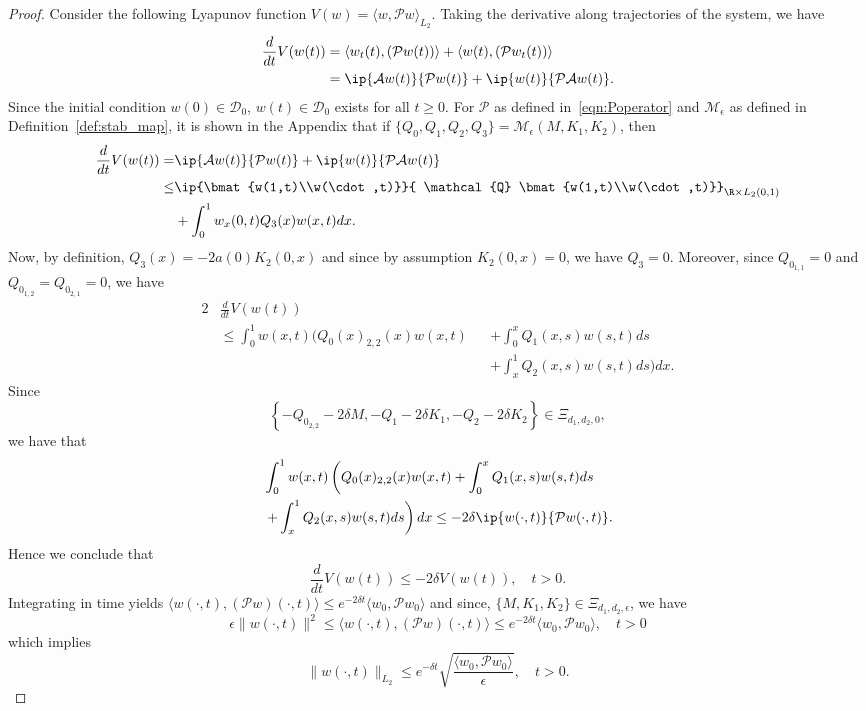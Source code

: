 \documentclass[9pt,journal,twocolumn]{IEEEtran}
\newcommand{\igzo}{\int_0^1}
\newcommand{\igzx}{\int_0^x}
\newcommand{\igxo}{\int_x^1}
\newcommand{\lt}{L_2(0,1)}
\begin{document}
\begin{proof}
 Consider the following Lyapunov function $ V(w)= \langle w,\mathcal{P}w \rangle_{L_2}$.
 Taking the derivative along trajectories of the system, we have
 \begin{align*}
 \frac{d}{dt}V(w(t))&= \langle w_t(t),(\mathcal{P}w(t)) \rangle+\langle w(t),(\mathcal{P}w_t(t)) \rangle\\
&=\ip{\mathcal{A}w(t)}{\mathcal{P}w(t)}+\ip{w(t)}{\mathcal{P}\mathcal{A}w(t)}.
\end{align*} Since the initial condition $w(0) \in \mathcal{D}_0$, $w(t) \in \mathcal{D}_0$ exists for all $t\ge 0$. For $\mathcal{P}$ as defined in~\eqref{eqn:Poperator} and $\mathcal{M}_\epsilon$ as defined in Definition~\ref{def:stab_map}, it is shown in the Appendix that if $\{Q_0,Q_1,Q_2,Q_3\}=\mathcal{M}_\epsilon(M,K_1,K_2)$, then
\begin{align*}
\frac{d}{dt}V(w(t))=&\ip{\mathcal{A}w(t)}{\mathcal{P}w(t)}+\ip{w(t)}{\mathcal{P}\mathcal{A}w(t)} \\
\leq&  \ip{\bmat{w(1,t)\\w(\cdot,t)}}{ \mathcal{Q} \bmat{w(1,t)\\w(\cdot,t)}}_{\R \times \lt} \\
&+\igzo w_x(0,t)Q_3(x)w(x,t)dx.
\end{align*} Now, by definition, $Q_3(x)=-2a(0)K_2(0,x)$ and since by assumption $K_2(0,x)=0$, we have $Q_3=0$. Moreover, since $Q_{0_{1,1}}=0$ and $Q_{0_{1,2}}=Q_{0_{2,1}}=0$, we have
\begin{alignat*}{2}
&\frac{d}{dt}V(w(t)) \\
&\leq  \igzo w(x,t) \bigg( Q_0(x)_{2,2}(x)w(x,t) &&+\igzx Q_1(x,s)w(s,t)ds \\
 &  &&+\igxo Q_2(x,s)w(s,t)ds \bigg)dx.  
\end{alignat*}
Since
\[
 \left\{-Q_{0_{2,2}}- 2\delta M,-Q_1- 2\delta K_1,-Q_2-2\delta K_2\right\} \in \Xi_{d_1,d_2,0},
\]
we have that
\begin{align*}
&\igzo w(x,t) \left( Q_0(x)_{2,2}(x)w(x,t)+\igzx Q_1(x,s)w(s,t)ds \right. \\
& \left. +\igxo Q_2(x,s)w(s,t)ds \right)dx \leq -2\delta \ip{w(\cdot,t)}{\mathcal{P}w(\cdot,t)}.
\end{align*}
Hence we conclude that
\[\frac{d}{dt}  V(w(t)) \leq -2\delta V(w(t)), \quad t>0.\]
Integrating in time yields $\langle w(\cdot,t), (\mathcal{P}w) (\cdot,t) \rangle \leq e^{-2 \delta t} \langle w_0, \mathcal{P}w_0 \rangle$ and since, $\{M,K_1,K_2\} \in \Xi_{d_1,d_2,\epsilon}$, we have
 \[
 \epsilon \|w(\cdot,t)\|^2 \leq \langle w(\cdot,t), (\mathcal{P}w) (\cdot,t) \rangle \leq e^{-2 \delta t} \langle w_0, \mathcal{P}w_0 \rangle, \quad t>0
 \]
 which implies
 \[
 \|w(\cdot,t)\|_{L_2} \leq e^{-\delta t} \sqrt{\frac{\langle w_0,\mathcal{P}w_0 \rangle}{\epsilon}}, \quad t > 0.
 \]
 \end{proof}
\end{document}
